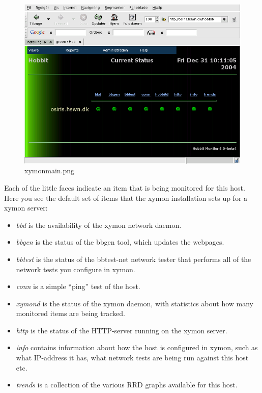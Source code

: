 \begin{figure} 
\centering \caption{xymonmain.png}
\label{xymonmain.png}
\includegraphics[scale=0.6]{./xymonmain.png} 
\end{figure}


 Each of the little faces indicate an item that is being monitored for
 this host. Here you see the default set of items that the xymon
 installation sets up for a xymon server:

\begin{itemize}
\item \emph{bbd}
 is the availability of the xymon network daemon.
\item \emph{bbgen}
 is the status of the bbgen tool, which updates the webpages.
\item \emph{bbtest}
 is the status of the bbtest-net network tester that performs all of
 the network tests you configure in xymon.

\item \emph{conn}
 is a simple ``ping'' test of the host.
\item \emph{xymond}
 is the status of the xymon daemon, with statistics about how many
 monitored items are being tracked.

\item \emph{http}
 is the status of the HTTP-server running on the xymon server.
\item \emph{info}
 contains information about how the host is configured in xymon, such
 as what IP-address it has, what network tests are being run against
 this host etc.

\item \emph{trends}
 is a collection of the various RRD graphs available for this host.

\end{itemize}


